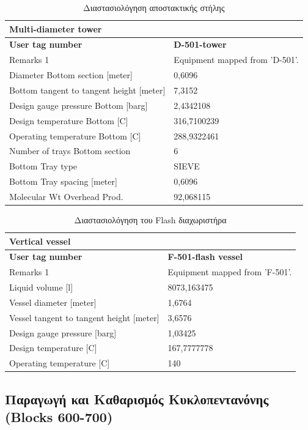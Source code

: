 \documentclass[11pt]{article}
\begin{document}
\begin{table}[htbp]
\caption{Διαστασιολόγηση αποστακτικής στήλης}
\centering
\begin{tabular}{ll}
\textbf{Multi-diameter tower} & \\
\hline
\textbf{User tag number} & \textbf{D-501-tower}\\
Remarks 1 & Equipment mapped from 'D-501'.\\
Diameter Bottom section [meter] & 0,6096\\
Bottom tangent to tangent height [meter] & 7,3152\\
Design gauge pressure Bottom [barg] & 2,4342108\\
Design temperature Bottom [C] & 316,7100239\\
Operating temperature Bottom [C] & 288,9322461\\
Number of trays Bottom section & 6\\
Bottom Tray type & SIEVE\\
Bottom Tray spacing [meter] & 0,6096\\
Molecular Wt Overhead Prod. & 92,068115\\
\end{tabular}
\end{table}


\begin{table}[htbp]
\caption{Διαστασιολόγηση του Flash διαχωριστήρα}
\centering
\begin{tabular}{ll}
\textbf{Vertical vessel} & \\
\hline
\textbf{User tag number} & \textbf{F-501-flash vessel}\\
Remarks 1 & Equipment mapped from 'F-501'.\\
Liquid volume [l] & 8073,163475\\
Vessel diameter [meter] & 1,6764\\
Vessel tangent to tangent height [meter] & 3,6576\\
Design gauge pressure [barg] & 1,03425\\
Design temperature [C] & 167,7777778\\
Operating temperature [C] & 140\\
\end{tabular}
\end{table}



\subsection{Παραγωγή και Καθαρισμός Κυκλοπεντανόνης (Blocks 600-700)}
\label{sec:orgaf41680}
\end{document}
